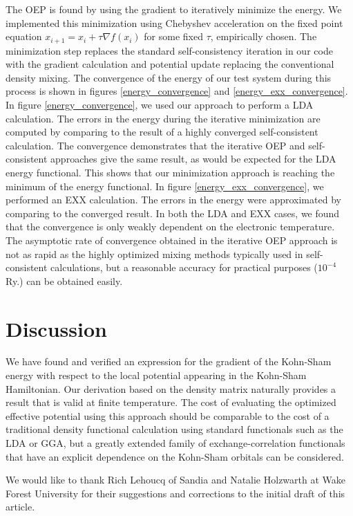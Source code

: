 \documentclass[12pt]{iopart}
\begin{document}
The OEP is found by using the gradient to iteratively minimize the energy.  We implemented this
minimization using Chebyshev acceleration on the fixed point equation
$x_{i+1} = x_i + \tau \nabla f(x_i)$ for some fixed $\tau$, empirically chosen.
The minimization step replaces the standard self-consistency iteration in our code with the
gradient calculation and potential update replacing the conventional density mixing.
The convergence of the energy of our test
system during this process is shown in figures
\ref{energy_convergence} and \ref{energy_exx_convergence}.
In figure \ref{energy_convergence}, we used our approach to perform a LDA calculation.
The errors in the energy during the iterative minimization are computed by comparing
to the result of a highly converged self-consistent calculation.  The convergence demonstrates
that the iterative OEP and self-consistent approaches give the same result, as would be expected
for the LDA energy functional.  This shows that our minimization approach is reaching the minimum
of the energy functional.
In figure \ref{energy_exx_convergence}, we performed an EXX calculation.
The errors in the energy were approximated by comparing to the converged result.
In both the LDA and EXX cases, we found that the convergence is only weakly dependent on the electronic
temperature.  The asymptotic rate of convergence obtained in the iterative OEP approach is
not as rapid as the highly optimized mixing methods typically used in self-consistent calculations,
but a reasonable accuracy for practical purposes ($10^{-4}$ Ry.) can be obtained easily.

\section{Discussion}

We have found and verified an expression for the gradient of the Kohn-Sham energy with
respect to the local potential appearing in the Kohn-Sham Hamiltonian.  Our derivation
based on the density matrix naturally provides a result that is valid at finite temperature.
The cost of evaluating the optimized effective potential using this approach should be
comparable to the cost of a traditional density functional calculation using standard
functionals such as the LDA or GGA, but a greatly extended family of exchange-correlation
functionals that have an explicit dependence on the Kohn-Sham orbitals can be considered.

\ack

We would like to thank Rich Lehoucq of Sandia and
Natalie Holzwarth at Wake Forest University for their
suggestions and corrections to the initial draft of
this article.
\end{document}
